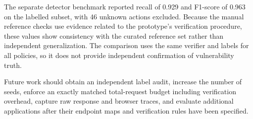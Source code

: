 \documentclass[conference, a4paper]{IEEEtran}
\begin{document}
The separate detector benchmark reported recall of 0.929
and F1-score of 0.963 on the labelled subset, with 46 unknown
actions excluded. Because the manual reference checks use
evidence related to the prototype's verification procedure,
these values show consistency with the curated reference set
rather than independent generalization. The comparison uses the
same verifier and labels for all policies, so it does not provide
independent confirmation of vulnerability truth.

Future work should obtain an independent label audit, increase
the number of seeds, enforce an exactly matched total-request
budget including verification overhead, capture raw response and
browser traces, and evaluate additional applications after their
endpoint maps and verification rules have been specified.
\end{document}
